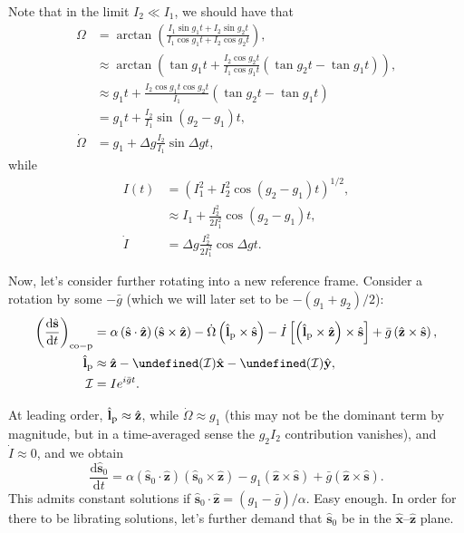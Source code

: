 \documentclass[12pt]{article}
\newcommand*{\rd}[2]{\frac{\mathrm{d}#1}{\mathrm{d}#2}}
\newcommand*{\bm}[1]{\boldsymbol{\mathbf{#1}}}
\newcommand*{\uv}[1]{\hat{\bm{#1}}}
\newcommand*{\p}[1]{\left(#1\right)}
\newcommand*{\s}[1]{\left[#1\right]}
\let\Re\undefined
\let\Im\undefined
\DeclareMathOperator{\Re}{Re}
\DeclareMathOperator{\Im}{Im}
\begin{document}
Note that in the limit $I_2 \ll I_1$, we should have that
\begin{align}
    \Omega
        &=
            \arctan\p{\frac{I_1 \sin g_1t + I_2\sin g_2t}{I_1\cos g_1t + I_2\cos
            g_2t}},\\
        &\approx
            \arctan\p{\tan g_1t
                + \frac{I_2\cos g_2t}{I_1\cos g_1t}\p{\tan g_2t - \tan g_1t}},\\
        &\approx
            g_1t +
                \frac{I_2 \cos g_1t\cos g_2t}{I_1}\p{\tan g_2t - \tan g_1t}
                    \nonumber\\
        &= g_1t +
                \frac{I_2}{I_1}\sin\p{g_2 - g_1}t,\\
    \dot{\Omega} &= g_1 + \Delta g\frac{I_2}{I_1}\sin\Delta gt,
\end{align}
while
\begin{align}
    I(t)
        &=
            \p{I_1^2 + I_2^2 \cos\p{g_2 - g_1}t}^{1/2},\\
        &\approx
            I_1
                + \frac{I_2^2}{2I_1^2}\cos\p{g_2 - g_1}t,\\
    \dot{I}
        &= \Delta g\frac{I_2^2}{2I_1^2}\cos\Delta gt.
\end{align}

Now, let's consider further rotating into a new reference frame.
Consider a rotation by some $-\bar{g}$ (which we will later set to be $-(g_1 +
g_2) / 2$):
\begin{align}
    \p{\rd{\uv{s}}{t}}_{\rm co-p}
        &=
            \alpha\p{\uv{s} \cdot \uv{z}}
                \p{\uv{s} \times \uv{z}}
                - \dot{\Omega}\p{\uv{l}_{\rm p} \times \uv{s}}
                - \dot{I}\s{\p{\uv{l}_{\rm p} \times \uv{z}} \times \uv{s}}
                + \bar{g}\p{\uv{z} \times \uv{s}}
                \label{eq:dsdt_toexpand}
                ,\\
    \uv{l}_{\rm p}
        &\approx
            \uv{z}
            - \Re(\mathcal{I}) \uv{x}
            - \Im(\mathcal{I}) \uv{y},\\
    \mathcal{I}
        &=
            Ie^{i\bar{g}t}.
\end{align}

At leading order, $\uv{l}_{\rm p} \approx \uv{z}$, while $\dot{\Omega} \approx
g_1$ (this may not be the dominant term by magnitude, but in a time-averaged
sense the $g_2I_2$ contribution vanishes), and $\dot{I} \approx 0$, and we
obtain
\begin{equation}
    \rd{\uv{s}_0}{t}
        =
            \alpha\p{\uv{s}_0 \cdot \uv{z}}
                \p{\uv{s}_0 \times \uv{z}}
                - g_1\p{\uv{z} \times \uv{s}}
                + \bar{g}\p{\uv{z} \times \uv{s}}.
\end{equation}
This admits constant solutions if $\uv{s}_0 \cdot \uv{z} = (g_1 - \bar{g}) /
\alpha$.
Easy enough.
In order for there to be librating solutions, let's further demand that
$\uv{s}_0$ be in the $\uv{x}$--$\uv{z}$ plane.
\end{document}
